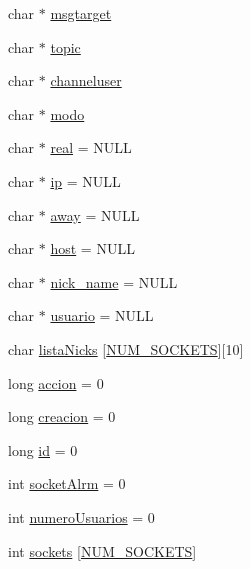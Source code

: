 \begin{DoxyCompactItemize}
\item 
char $\ast$ \hyperlink{_g-2361-06-_p1-_server_8c_a968dcc7e43caeca7959f3c069dcccc6a}{msgtarget}
\item 
char $\ast$ \hyperlink{_g-2361-06-_p1-_server_8c_affecb48e716753e10b44feac31f12529}{topic}
\item 
char $\ast$ \hyperlink{_g-2361-06-_p1-_server_8c_a55a7bd8f3229706c5917445aba995c5b}{channeluser}
\item 
char $\ast$ \hyperlink{_g-2361-06-_p1-_server_8c_a7451f0d59207b53af6178219fcf62677}{modo}
\item 
char $\ast$ \hyperlink{_g-2361-06-_p1-_server_8c_af832f551e1c343666c3d2a55834139a0}{real} = N\+U\+LL
\item 
char $\ast$ \hyperlink{_g-2361-06-_p1-_server_8c_afbc356cd0e25d1dbbece7c10fd025fa6}{ip} = N\+U\+LL
\item 
char $\ast$ \hyperlink{_g-2361-06-_p1-_server_8c_adf86742e21384f58f8999d8317e6a370}{away} = N\+U\+LL
\item 
char $\ast$ \hyperlink{_g-2361-06-_p1-_server_8c_a1c2046dcb30a629d6d9f45ff8f403f12}{host} = N\+U\+LL
\item 
char $\ast$ \hyperlink{_g-2361-06-_p1-_server_8c_aabbf66718cda228b924a4a9441eadf62}{nick\+\_\+name} = N\+U\+LL
\item 
char $\ast$ \hyperlink{_g-2361-06-_p1-_server_8c_a0147a5b81499984f9cb00379a8cb84af}{usuario} = N\+U\+LL
\item 
char \hyperlink{_g-2361-06-_p1-_server_8c_a713172366a6be2fbf8456a4b43702603}{lista\+Nicks} \mbox{[}\hyperlink{_g-2361-06-_p1-_sockets_8h_a1c803e4ececfb47d2791c9283c85eb00}{N\+U\+M\+\_\+\+S\+O\+C\+K\+E\+TS}\mbox{]}\mbox{[}10\mbox{]}
\item 
long \hyperlink{_g-2361-06-_p1-_server_8c_a93e785c991445d8b8ee99c2e51242d5a}{accion} = 0
\item 
long \hyperlink{_g-2361-06-_p1-_server_8c_a26292066ca0d17922eadee4161542ab9}{creacion} = 0
\item 
long \hyperlink{_g-2361-06-_p1-_server_8c_a7350fbd6ad10618f3b750b1f99ca5c3c}{id} = 0
\item 
int \hyperlink{_g-2361-06-_p1-_server_8c_a882bc4c5a2b02dd85d4716961c4d902f}{socket\+Alrm} = 0
\item 
int \hyperlink{_g-2361-06-_p1-_server_8c_ac9a5ec6f534d2a8e2a870179807d32dc}{numero\+Usuarios} = 0
\item 
int \hyperlink{_g-2361-06-_p1-_server_8c_a7724e53f22e431d1ecb6516951a172e1}{sockets} \mbox{[}\hyperlink{_g-2361-06-_p1-_sockets_8h_a1c803e4ececfb47d2791c9283c85eb00}{N\+U\+M\+\_\+\+S\+O\+C\+K\+E\+TS}\mbox{]}
\end{DoxyCompactItemize}


